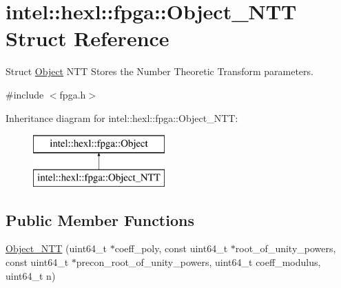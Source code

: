 \hypertarget{structintel_1_1hexl_1_1fpga_1_1Object__NTT}{\section{intel\-:\-:hexl\-:\-:fpga\-:\-:Object\-\_\-\-N\-T\-T Struct Reference}
\label{structintel_1_1hexl_1_1fpga_1_1Object__NTT}
}


Struct \hyperlink{structintel_1_1hexl_1_1fpga_1_1Object}{Object} N\-T\-T Stores the Number Theoretic Transform parameters.  




{\ttfamily \#include $<$fpga.\-h$>$}

Inheritance diagram for intel\-:\-:hexl\-:\-:fpga\-:\-:Object\-\_\-\-N\-T\-T\-:\begin{figure}[H]
\begin{center}
\leavevmode
\includegraphics[height=2.000000cm]{structintel_1_1hexl_1_1fpga_1_1Object__NTT}
\end{center}
\end{figure}
\subsection*{Public Member Functions}
\begin{DoxyCompactItemize}
\item 
\hyperlink{structintel_1_1hexl_1_1fpga_1_1Object__NTT_a0e477200da8200247454023763e37cf4}{Object\-\_\-\-N\-T\-T} (uint64\-\_\-t $\ast$coeff\-\_\-poly, const uint64\-\_\-t $\ast$root\-\_\-of\-\_\-unity\-\_\-powers, const uint64\-\_\-t $\ast$precon\-\_\-root\-\_\-of\-\_\-unity\-\_\-powers, uint64\-\_\-t coeff\-\_\-modulus, uint64\-\_\-t n)
\end{DoxyCompactItemize}
